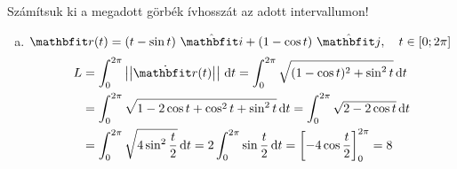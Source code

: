 \documentclass[exercise]{math-standalone}
\begin{document}
\begin{exercise}{Számítsuk ki a megadott görbék ívhosszát az adott intervallumon!}
{\begin{enumerate}[a)]
      \item $\rvec r(t) = \ijz{t - \sin t}{1 - \cos t}, \quad t \in [0; 2\pi]$
            \begin{align*}
              L
               & = \int_0^{2\pi} \norma{\dot{\rvec r}(t)} \, \diff t
              = \int_0^{2\pi} \sqrt{(1 - \cos t)^2 + \sin^2 t} \, \diff t
              \\
               & = \int_0^{2\pi} \sqrt{1 - 2\cos t + \cos^2 t + \sin^2 t} \, \diff t
              = \int_0^{2\pi} \sqrt{2 - 2\cos t} \, \diff t
              \\
               & = \int_0^{2\pi} \sqrt{4 \sin^2 \frac{t}{2}} \, \diff t
              = 2 \int_0^{2\pi} \sin \frac{t}{2} \, \diff t
              = \left[ -4 \cos \frac{t}{2} \right]_0^{2\pi}
              = 8
            \end{align*}
    \end{enumerate}
  }
\end{exercise}
\end{document}

